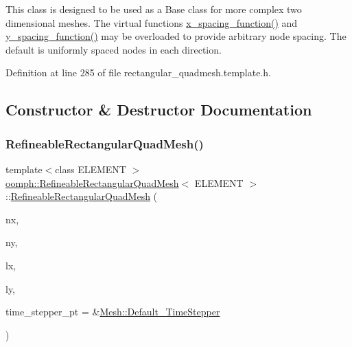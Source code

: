 This class is designed to be used as a Base class for more complex two dimensional meshes. The virtual functions \hyperlink{classoomph_1_1RectangularQuadMesh_ad4c2f349cf201cb3107f0a4e5447c16f}{x\+\_\+spacing\+\_\+function()} and \hyperlink{classoomph_1_1RectangularQuadMesh_ae78204de1f176cdf2e819673bd34e78a}{y\+\_\+spacing\+\_\+function()} may be overloaded to provide arbitrary node spacing. The default is uniformly spaced nodes in each direction. 

Definition at line 285 of file rectangular\+\_\+quadmesh.\+template.\+h.



\subsection{Constructor \& Destructor Documentation}
\mbox{\label{classoomph_1_1RefineableRectangularQuadMesh_ac00e380a8fa1bdfc63fd25fdf9b5fbf0}} 
\subsubsection{\texorpdfstring{Refineable\+Rectangular\+Quad\+Mesh()}{RefineableRectangularQuadMesh()}\hspace{0.1cm}{\footnotesize\ttfamily [1/4]}}
{\footnotesize\ttfamily template$<$class E\+L\+E\+M\+E\+NT $>$ \\
\hyperlink{classoomph_1_1RefineableRectangularQuadMesh}{oomph\+::\+Refineable\+Rectangular\+Quad\+Mesh}$<$ E\+L\+E\+M\+E\+NT $>$\+::\hyperlink{classoomph_1_1RefineableRectangularQuadMesh}{Refineable\+Rectangular\+Quad\+Mesh} (\begin{DoxyParamCaption}\item[{const unsigned \&}]{nx,  }\item[{const unsigned \&}]{ny,  }\item[{const double \&}]{lx,  }\item[{const double \&}]{ly,  }\item[{\hyperlink{classoomph_1_1TimeStepper}{Time\+Stepper} $\ast$}]{time\+\_\+stepper\+\_\+pt = {\ttfamily \&\hyperlink{classoomph_1_1Mesh_a12243d0fee2b1fcee729ee5a4777ea10}{Mesh\+::\+Default\+\_\+\+Time\+Stepper}} }\end{DoxyParamCaption})\hspace{0.3cm}{\ttfamily [inline]}}



